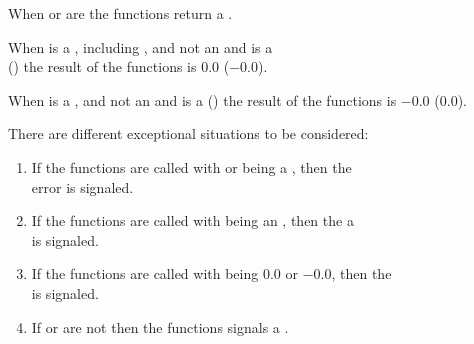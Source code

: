 \documentclass[../Exponentials-Logarithms-Trigonometry.tex]{subfiles}
\begin{document}
\noindent
When  or  are
 the functions return a .

\noindent
When  is a , including ,
and not an  and  is a
\\
() the result of the
functions is $0.0$ ($-0.0$).

\noindent
When  is a ,
and not an  and  is a
 () the result of the
functions is $-0.0$ ($0.0$).

\DExceptional{}

There are different exceptional situations to be considered:
\begin{enumerate}
\item If the functions are called with
   or  being a
  , then the\\
   error is signaled.
\item If the functions are called with  being an
  , then the a\\
    is signaled.
\item If the functions are called with  being $0.0$ or $-0.0$, then
  the \\
    is signaled.
\item If  or  are not \CL{}
   then the functions signals a .
\end{enumerate}
\end{document}
